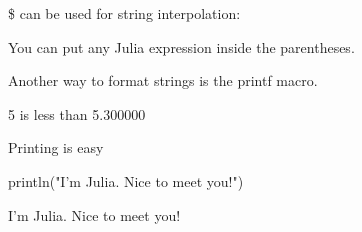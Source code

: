 \documentclass[ignorenonframetext,]{beamer}
\newenvironment{Shaded}{}{}
\newcommand{\FloatTok}[1]{\textcolor[rgb]{0.25,0.63,0.44}{{#1}}}
\newcommand{\StringTok}[1]{\textcolor[rgb]{0.25,0.44,0.63}{{#1}}}
\newcommand{\CommentTok}[1]{\textcolor[rgb]{0.38,0.63,0.69}{\textit{{#1}}}}
\newcommand{\NormalTok}[1]{{#1}}
\begin{document}
\begin{frame}[fragile]{\$ can be used for string interpolation:}

\begin{Shaded}
\end{Shaded}

\begin{block}{You can put any Julia expression inside the parentheses.}

\end{block}

\begin{block}{Another way to format strings is the printf macro.}

\begin{Shaded}
\end{Shaded}

\begin{Shaded}
\begin{Highlighting}[]
\FloatTok{5} \NormalTok{is less than }\FloatTok{5.300000}
\end{Highlighting}
\end{Shaded}

\end{block}

\end{frame}

\begin{frame}[fragile]{Printing is easy}

\begin{Shaded}
\begin{Highlighting}[]
\NormalTok{println(}\StringTok{"I'm Julia. Nice to meet you!"}\NormalTok{)}
\end{Highlighting}
\end{Shaded}

\begin{Shaded}
\begin{Highlighting}[]
\NormalTok{I'm Julia. Nice to meet you!}
\end{Highlighting}
\end{Shaded}

\end{frame}
\end{document}
